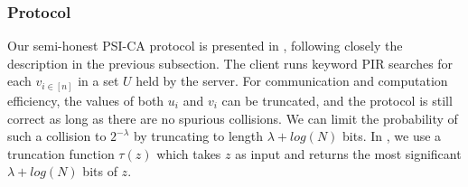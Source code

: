 \subsubsection{Protocol}
Our semi-honest PSI-CA protocol is presented in , following closely the description in the previous subsection. The client runs keyword PIR searches for each $v_{i\in [n]}$ in a set $U$ held by the server. For communication and computation efficiency, the values of both $u_i$ and $v_i$ can be truncated, and the protocol is still correct as long as there are no spurious collisions. We can limit the probability of such a collision to $2^{-\lambda}$ by truncating to length $\lambda + log(N)$ bits. In , we use a truncation function $\tau(z)$ which takes $z$ as input and returns the most significant $\lambda + log(N)$ bits of $z$.

